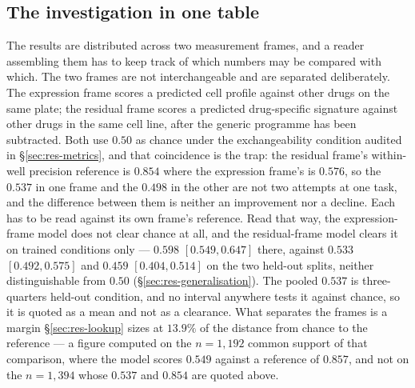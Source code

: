 \subsection{The investigation in one table}
\label{sec:res-summary}

The results are distributed across two measurement frames, and a reader assembling them has to keep
track of which numbers may be compared with which. The two frames are not interchangeable and are
separated deliberately. The expression frame scores a predicted cell profile against other drugs on
the same plate; the residual frame scores a predicted drug-specific signature against other drugs in
the same cell line, after the generic programme has been subtracted. Both use $0.50$ as chance under
the exchangeability condition audited in \S\ref{sec:res-metrics}, and that coincidence is the trap:
the residual frame's within-well precision
reference is $0.854$ where the expression frame's is $0.576$, so the $0.537$ in one frame and the
$0.498$ in the other are not two attempts at one task, and the difference between them is neither an
improvement nor a decline. Each has to be read against its own frame's reference. Read that way, the
expression-frame model does not clear chance at all, and the residual-frame model clears it on
trained conditions only --- $0.598$ \nolinebreak[3]$[0.549, 0.647]$ there, against
$0.533$ \nolinebreak[3]$[0.492, 0.575]$ and $0.459$ \nolinebreak[3]$[0.404, 0.514]$ on the two
held-out splits, neither distinguishable from $0.50$ (\S\ref{sec:res-generalisation}). The pooled
$0.537$ is three-quarters held-out condition, and no interval anywhere tests it against chance, so
it is quoted as a mean and not as a clearance. What separates the frames is a
margin \S\ref{sec:res-lookup} sizes at $13.9\%$ of the distance from chance to the reference --- a
figure computed on the $n = 1{,}192$ common support of that comparison, where the model scores
$0.549$ against a reference of $0.857$, and not on the $n = 1{,}394$ whose $0.537$ and $0.854$ are
quoted above.

